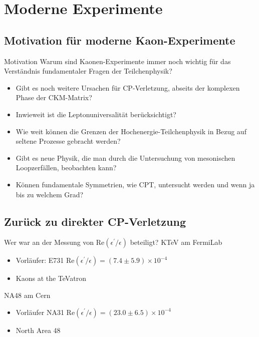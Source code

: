 \documentclass[aspectratio=1610, professionalfonts, 9pt, t]{beamer}
\begin{document}
  \section{Moderne Experimente}

  \subsection{Motivation für moderne Kaon-Experimente}

  \begin{frame}{Motivation}
    Warum sind Kaonen-Experimente immer noch wichtig für das Verständnis fundamentaler Fragen der Teilchenphysik?
    \begin{itemize}
      \item Gibt es noch weitere Ursachen für CP-Verletzung, abseits der komplexen Phase der CKM-Matrix?
      \item Inwieweit ist die Leptonuniversalität berücksichtigt?
      \item Wie weit können die Grenzen der Hochenergie-Teilchenphysik in Bezug auf seltene Prozesse gebracht werden?
      \item Gibt es neue Physik, die man durch die Untersuchung von mesonischen Loopzerfällen, beobachten kann?
      \item Können fundamentale Symmetrien, wie CPT, untersucht werden und wenn ja bis zu welchem Grad?
    \end{itemize}
  \end{frame}

  \subsection{Zurück zu direkter CP-Verletzung}

  \begin{frame}{Wer war an der Messung von Re$(\epsilon^{\prime} / \epsilon)$ beteiligt?}
    KTeV am FermiLab
    \begin{itemize}
      \item Vorläufer: E731 \rightarrow Re$(\epsilon^{\prime} / \epsilon) = (7.4\pm5.9) \times10^{-4}$
      \item Kaons at the TeVatron
    \end{itemize}
    NA48 am Cern
    \begin{itemize}
      \item Vorläufer NA31 \rightarrow Re$(\epsilon^{\prime} / \epsilon) = (23.0\pm6.5) \times10^{-4}$
      \item North Area 48
    \end{itemize}
  \end{frame}
\end{document}
